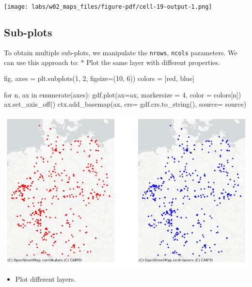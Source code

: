 \documentclass[
  letterpaper,
  DIV=11,
  numbers=noendperiod]{scrreprt}
\newenvironment{Shaded}{\begin{snugshade}}{\end{snugshade}}
\newcommand{\BuiltInTok}[1]{\textcolor[rgb]{0.00,0.23,0.31}{#1}}
\newcommand{\ControlFlowTok}[1]{\textcolor[rgb]{0.00,0.23,0.31}{#1}}
\newcommand{\DecValTok}[1]{\textcolor[rgb]{0.68,0.00,0.00}{#1}}
\newcommand{\KeywordTok}[1]{\textcolor[rgb]{0.00,0.23,0.31}{#1}}
\newcommand{\NormalTok}[1]{\textcolor[rgb]{0.00,0.23,0.31}{#1}}
\newcommand{\OperatorTok}[1]{\textcolor[rgb]{0.37,0.37,0.37}{#1}}
\newcommand{\StringTok}[1]{\textcolor[rgb]{0.13,0.47,0.30}{#1}}
\providecommand{\tightlist}{%
  \setlength{\itemsep}{0pt}\setlength{\parskip}{0pt}}\usepackage{longtable,booktabs,array}
\begin{document}
\texttt{[image: labs/w02\_maps\_files/figure-pdf/cell-19-output-1.png]}

\subsection{Sub-plots}\label{sub-plots}

To obtain multiple sub-plots, we manipulate the \texttt{nrows},
\texttt{ncols} parameters. We can use this approach to: * Plot the same
layer with different properties.

\begin{Shaded}
\begin{Highlighting}[]
\NormalTok{fig, axes }\OperatorTok{=}\NormalTok{ plt.subplots(}\DecValTok{1}\NormalTok{, }\DecValTok{2}\NormalTok{, figsize}\OperatorTok{=}\NormalTok{(}\DecValTok{10}\NormalTok{, }\DecValTok{6}\NormalTok{))}
\NormalTok{colors }\OperatorTok{=}\NormalTok{ [}\StringTok{\textquotesingle{}red\textquotesingle{}}\NormalTok{, }\StringTok{\textquotesingle{}blue\textquotesingle{}}\NormalTok{]}

\ControlFlowTok{for}\NormalTok{ n, ax }\KeywordTok{in} \BuiltInTok{enumerate}\NormalTok{(axes):}
\NormalTok{    gdf.plot(ax}\OperatorTok{=}\NormalTok{ax, markersize }\OperatorTok{=} \DecValTok{4}\NormalTok{, color }\OperatorTok{=}\NormalTok{ colors[n])}
\NormalTok{    ax.set\_axis\_off()}
\NormalTok{    ctx.add\_basemap(ax, crs}\OperatorTok{=}\NormalTok{ gdf.crs.to\_string(), source}\OperatorTok{=}\NormalTok{ source)}
\end{Highlighting}
\end{Shaded}

\includegraphics{labs/w02_maps_files/figure-pdf/cell-20-output-1.png}

\begin{itemize}
\tightlist
\item
  Plot different layers.
\end{itemize}
\end{document}

